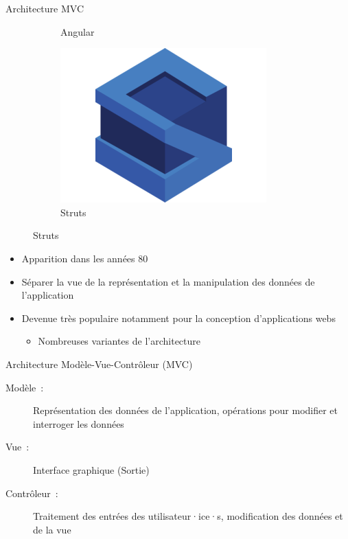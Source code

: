 \documentclass[xcolor=table]{beamer}
\begin{document}
\begin{frame}{Architecture MVC}
\begin{figure}
\begin{subfigure}{0.22\linewidth}
        \caption*{Angular}
    \end{subfigure}
    \begin{subfigure}{0.22\linewidth}
        \centering
        \includegraphics[scale=0.15]{fig/struts.png}
        \caption*{Struts}
    \end{subfigure}
\end{figure}
\begin{itemize}
    \item Apparition dans les années 80
    \item Séparer la vue de la représentation et la manipulation des données de l'application
    \item Devenue très populaire notamment pour la conception d'applications webs
    \begin{itemize}
        \item Nombreuses variantes de l'architecture
    \end{itemize}
\end{itemize}
\end{frame}

\begin{frame}{Architecture Modèle-Vue-Contrôleur (MVC)}
\begin{figure}
\centering
{}
\end{figure}
\begin{description}
    \item[Modèle~:] Représentation des données de l'application, opérations pour modifier et interroger les données
    \item[Vue~:] Interface graphique (Sortie)
    \item[Contrôleur~:] Traitement des entrées des utilisateur·ice·s, modification des données et de la vue
\end{description}
\end{frame}
\end{document}
